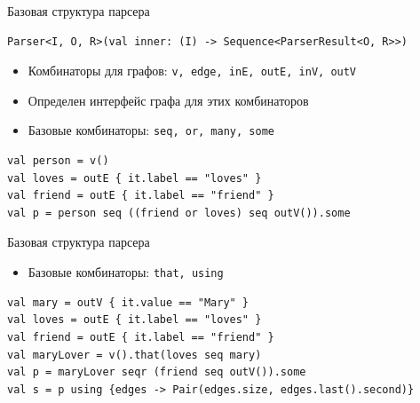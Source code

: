 \documentclass[aspectratio=169]{beamer}
\begin{document}
\begin{frame}[fragile]{Базовая структура парсера}
  \begin{verbatim}
Parser<I, O, R>(val inner: (I) -> Sequence<ParserResult<O, R>>)
  \end{verbatim}
  \begin{itemize}
    \item Комбинаторы для графов: \texttt{v, edge, inE, outE, inV, outV}
    \item Определен интерфейс графа для этих комбинаторов
    \item Базовые комбинаторы: \texttt{seq, or, many, some}
  \end{itemize}
  \begin{verbatim}
val person = v()
val loves = outE { it.label == "loves" }
val friend = outE { it.label == "friend" }
val p = person seq ((friend or loves) seq outV()).some
  \end{verbatim}
\end{frame}

\begin{frame}[fragile]{Базовая структура парсера}
  \begin{itemize}
    \item Базовые комбинаторы: \texttt{that, using}
  \end{itemize}
  \begin{verbatim}
val mary = outV { it.value == "Mary" }
val loves = outE { it.label == "loves" }
val friend = outE { it.label == "friend" }
val maryLover = v().that(loves seq mary)
val p = maryLover seqr (friend seq outV()).some
val s = p using {edges -> Pair(edges.size, edges.last().second)}
  \end{verbatim}
\end{frame}
\end{document}
